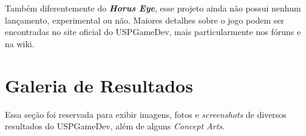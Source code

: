 \documentclass[12pt,onecolumn,a4paper]{article}
\begin{document}
        Também diferentemente do \textit{\textbf{Horus Eye}}, esse projeto ainda não possui nenhum
        lançamento, experimental ou não. Maiores detalhes sobre o jogo podem ser encontradas no site
        oficial do USPGameDev, mais particularmente nos fóruns e na wiki.



    



\section{\LARGE Galeria de Resultados}

    Essa seção foi reservada para exibir imagens, fotos e \textit{screenshots} de diversos
    resultados do USPGameDev, além de alguns \textit{Concept Arts}\footnotemark.
        
    
        \FloatBarrier
        
    
\end{document}
